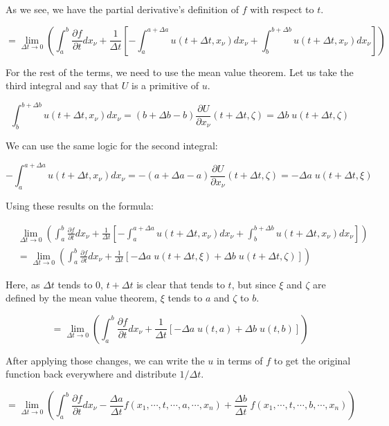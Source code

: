 \documentclass[12pt]{article}
\begin{document}
	As we see, we have the partial derivative's definition of $f$ with respect to $t$.
	
	\[
		= \lim_{\Delta t \to 0} \left( \int_a^b \frac{\partial f}{\partial t} dx_\nu + \frac{1}{\Delta t} \left[ - \int_a^{a + \Delta a} u(t + \Delta t, x_\nu) dx_\nu + \int_b^{b + \Delta b} u(t + \Delta t, x_\nu) dx_\nu \right] \right)
	\]
	
	For the rest of the terms, we need to use the mean value theorem. Let us take the third integral and say that $U$ is a primitive of $u$.
	
	\[
		\int_b^{b + \Delta b} u(t + \Delta t, x_\nu) dx_\nu
		= (b + \Delta b - b) \frac{\partial U}{\partial x_\nu}(t + \Delta t, \zeta)
		= \Delta b \; u(t + \Delta t, \zeta)
	\]
	
	We can use the same logic for the second integral:
	
	\[
		-\int_a^{a + \Delta a} u(t + \Delta t, x_\nu) dx_\nu
		= -(a + \Delta a - a) \frac{\partial U}{\partial x_\nu}(t + \Delta t, \zeta)
		= -\Delta a \; u(t + \Delta t, \xi)
	\]
	
	Using these results on the formula:
	
	\[
		\begin{aligned}
			& \lim_{\Delta t \to 0} \left( \int_a^b \frac{\partial f}{\partial t} dx_\nu + \frac{1}{\Delta t} \left[ - \int_a^{a + \Delta a} u(t + \Delta t, x_\nu) dx_\nu + \int_b^{b + \Delta b} u(t + \Delta t, x_\nu) dx_\nu \right] \right)
			\\
			& = \lim_{\Delta t \to 0} \left( \int_a^b \frac{\partial f}{\partial t} dx_\nu + \frac{1}{\Delta t} \left[ - \Delta a \; u(t + \Delta t, \xi) + \Delta b \; u(t + \Delta t, \zeta) \right] \right)
		\end{aligned}
	\]
	
	Here, as $\Delta t$ tends to 0, $t + \Delta t$ is clear that tends to $t$, but since $\xi$ and $\zeta$ are defined by the mean value theorem, $\xi$ tends to $a$ and $\zeta$ to $b$.
	
	\[
		= \lim_{\Delta t \to 0} \left( \int_a^b \frac{\partial f}{\partial t} dx_\nu + \frac{1}{\Delta t} \left[ - \Delta a \; u(t, a) + \Delta b \; u(t, b) \right] \right)
	\]
	
	After applying those changes, we can write the $u$ in terms of $f$ to get the original function back everywhere and distribute $1/\Delta t$.
	
	\[
		= \lim_{\Delta t \to 0} \left( \int_a^b \frac{\partial f}{\partial t} dx_\nu - \frac{\Delta a}{\Delta t} f(x_1, \cdots, t, \cdots, a, \cdots, x_n) + \frac{\Delta b}{\Delta t} \; f(x_1, \cdots, t, \cdots, b, \cdots, x_n) \right)
	\]
	
\end{document}
